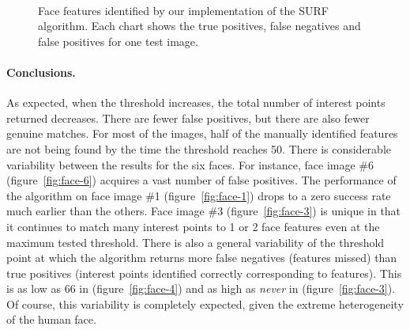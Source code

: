 \begin{figure} [h]
  \centering
  \\
  \caption[Face features identified by our SURF implementation (images 5 \& 6)]{Face features identified by our implementation of the SURF algorithm. Each chart shows the true positives, false negatives and false positives for one test image.}
  \label{fig:face-features-hits-3}
\end{figure}

\paragraph{Conclusions.}
As expected, when the threshold increases, the total number of interest points returned decreases. There are fewer false positives, but there are also fewer genuine matches. For most of the images, half of the manually identified features are not being found by the time the threshold reaches 50. There is considerable variability between the results for the six faces. For instance, face image \#6 (figure~\ref{fig:face-6}) acquires a vast number of false positives. The performance of the algorithm on face image \#1 (figure~\ref{fig:face-1}) drops to a zero success rate much earlier than the others. Face image \#3 (figure~\ref{fig:face-3}) is unique in that it continues to match many interest points to 1 or 2 face features even at the maximum tested threshold. There is also a 
general variability of the threshold point at which the algorithm returns more false negatives (features missed) than true positives (interest points identified correctly corresponding to features). This is as low as 66 in (figure~\ref{fig:face-4}) and as high as \emph{never} in (figure~\ref{fig:face-3}). Of course, this variability is completely expected, given the extreme heterogeneity of the human face.
